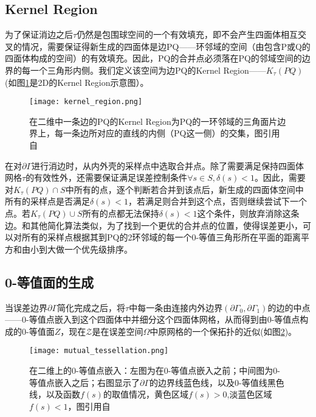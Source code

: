 \subsection{Kernel Region}
为了保证消边之后$\tau$仍然是包围球空间的一个有效填充，即不会产生四面体相互交叉的情况，需要保证得新生成的四面体是边PQ——环邻域的空间（由包含P或Q的四面体构成的空间）的有效填充。因此，PQ的合并点必须落在PQ的邻域空间的边界的每一个三角形内侧。我们定义该空间为边PQ的Kernel Region——$K_\tau(PQ)$(如图\ref{fig:kernel-region}是2D的Kernel Region示意图）。
\begin{figure}[htbp]
    \centering
    \texttt{[image: kernel\_region.png]}
    \caption[2D Kernel Region]{在二维中一条边的PQ的Kernel Region为PQ的一环邻域的三角面片边界上，每一条边所对应的直线的内侧（PQ这一侧）的交集，图引用自\cite{isotopic-appro}}
    \label{fig:kernel-region}
\end{figure}
\par 在对$\partial \Gamma$进行消边时，从内外壳的采样点中选取合并点。除了需要满足保持四面体网格$\tau$的有效性外，还需要保证满足误差控制条件$\forall s \in S, \delta(s) < 1$。因此，需要对$K_\tau (PQ) \cap S$中所有的点，逐个判断若合并到该点后，新生成的四面体空间中所有的采样点是否满足$\delta(s) < 1$，若满足则合并到这个点，否则继续尝试下一个点。若$K_\tau (PQ) \cup S$所有的点都无法保持$\delta(s) < 1$这个条件，则放弃消除这条边。和其他简化算法类似，为了找到一个更优的合并点的位置，使得误差更小，可以对所有的采样点根据其到PQ的2环邻域的每一个0-等值三角形所在平面的距离平方和由小到大做一个优先级排序。
\subsection{0-等值面的生成}
当误差边界$\partial \Gamma$简化完成之后，将$\tau$中每一条由连接内外边界$(\partial \Gamma_0, \partial \Gamma_1)$的边的中点——0-等值点嵌入到这个四面体中并细分这个四面体网格，从而得到由0-等值点构成的0-等值面$\mathcal{Ζ}$，现在$\mathcal{Z}$是在误差空间$\Omega$中原网格的一个保拓扑的近似(如图\ref{fig:mutual-tessellation})。
\begin{figure}[htbp]
    \centering
    \texttt{[image: mutual\_tessellation.png]}
    \caption[Mutual tessellation]{在二维上的0-等值点嵌入：左图为在0-等值点嵌入之前；中间图为0-等值点嵌入之后；右图显示了$\partial \Gamma$的边界线蓝色线，以及0-等值线黑色线，以及函数$f(s)$的取值情况，黄色区域$f(s) > 0$,淡蓝色区域$f(s) < 1$，图引用自\cite{isotopic-appro}}
    \label{fig:mutual-tessellation}
\end{figure}

